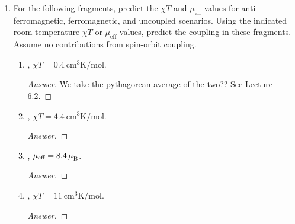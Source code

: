 \documentclass[../psets.tex]{subfiles}
\begin{document}
\begin{enumerate}
\begin{enumerate}
\begin{proof}[Answer]
            The heavy atoms can be identified by the $K$-edge energy. The oxidation state can technically be identified by the $K$-edge shift from the standard, although XAS is typically more useful for measuring relative oxidation states than "absolute" ones. The coordination environment can be determined by fitting the EXAFS data to the EXAFS equation.
        \end{proof}
        \item Your results tell you that the oxidation states of  and  are $6+$ and $1+$, respectively. How could you determine the protonation state of the hydroxide ( or ) with ENDOR spectroscopy?
        \begin{proof}[Answer]
            ENDOR turns on extra transitions. Protonation should correlate with the oxidation state, affecting splitting. Since ENDOR allows us to resolve extra transitions and learn more about electron transitions that are coupled to local nuclear transitions, that could also be of use.
        \end{proof}
    \end{enumerate}
    \item For the following fragments, predict the $\chi T$ and $\mu_\text{eff}$ values for anti-ferromagnetic, ferromagnetic, and uncoupled scenarios. Using the indicated room temperature $\chi T$ or $\mu_\text{eff}$ values, predict the coupling in these fragments. Assume no contributions from spin-orbit coupling.
    \begin{enumerate}
        \item {}, $\chi T=\SI{0.4}{\centi\meter\cubed\kelvin\per\mole}$.
        \begin{proof}[Answer]
            We take the pythagorean average of the two?? See Lecture 6.2.
        \end{proof}
        \item {}, $\chi T=\SI{4.4}{\centi\meter\cubed\kelvin\per\mole}$.
        \begin{proof}[Answer]
            
        \end{proof}
        \item {}, $\mu_\text{eff}=8.4\,{\mu_\text{B}^{}}$.
        \begin{proof}[Answer]
            
        \end{proof}
        \item {}, $\chi T=\SI{11}{\centi\meter\cubed\kelvin\per\mole}$.
        \begin{proof}[Answer]
            

\end{proof}
\end{enumerate}
\end{enumerate}
\end{document}
